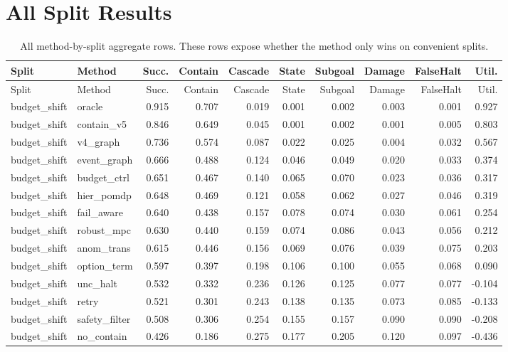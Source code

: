 \documentclass{article}
\begin{document}
\section{All Split Results}
\begin{longtable}{@{}llrrrrrrrr@{}}
\caption{All method-by-split aggregate rows. These rows expose whether the method only wins on convenient splits.}\\
\toprule
Split & Method & Succ. & Contain & Cascade & State & Subgoal & Damage & FalseHalt & Util.\\
\midrule
\endfirsthead
\toprule
Split & Method & Succ. & Contain & Cascade & State & Subgoal & Damage & FalseHalt & Util.\\
\midrule
\endhead
budget\_shift & oracle & 0.915 & 0.707 & 0.019 & 0.001 & 0.002 & 0.003 & 0.001 & 0.927 \\
budget\_shift & contain\_v5 & 0.846 & 0.649 & 0.045 & 0.001 & 0.002 & 0.001 & 0.005 & 0.803 \\
budget\_shift & v4\_graph & 0.736 & 0.574 & 0.087 & 0.022 & 0.025 & 0.004 & 0.032 & 0.567 \\
budget\_shift & event\_graph & 0.666 & 0.488 & 0.124 & 0.046 & 0.049 & 0.020 & 0.033 & 0.374 \\
budget\_shift & budget\_ctrl & 0.651 & 0.467 & 0.140 & 0.065 & 0.070 & 0.023 & 0.036 & 0.317 \\
budget\_shift & hier\_pomdp & 0.648 & 0.469 & 0.121 & 0.058 & 0.062 & 0.027 & 0.046 & 0.319 \\
budget\_shift & fail\_aware & 0.640 & 0.438 & 0.157 & 0.078 & 0.074 & 0.030 & 0.061 & 0.254 \\
budget\_shift & robust\_mpc & 0.630 & 0.440 & 0.159 & 0.074 & 0.086 & 0.043 & 0.056 & 0.212 \\
budget\_shift & anom\_trans & 0.615 & 0.446 & 0.156 & 0.069 & 0.076 & 0.039 & 0.075 & 0.203 \\
budget\_shift & option\_term & 0.597 & 0.397 & 0.198 & 0.106 & 0.100 & 0.055 & 0.068 & 0.090 \\
budget\_shift & unc\_halt & 0.532 & 0.332 & 0.236 & 0.126 & 0.125 & 0.077 & 0.077 & -0.104 \\
budget\_shift & retry & 0.521 & 0.301 & 0.243 & 0.138 & 0.135 & 0.073 & 0.085 & -0.133 \\
budget\_shift & safety\_filter & 0.508 & 0.306 & 0.254 & 0.155 & 0.157 & 0.090 & 0.090 & -0.208 \\
budget\_shift & no\_contain & 0.426 & 0.186 & 0.275 & 0.177 & 0.205 & 0.120 & 0.097 & -0.436 \\

\end{longtable}
\end{document}
